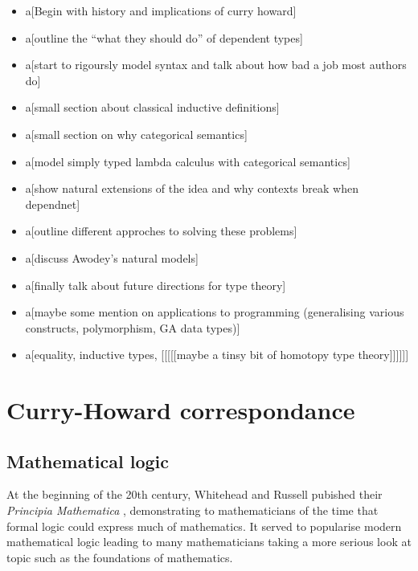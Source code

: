 \begin{itemize}
\item a[Begin with history and implications of curry howard]

\item a[outline the ``what they should do'' of dependent types]

\item a[start to rigoursly model syntax and talk about how bad a job most authors do]

\item a[small section about classical inductive definitions]

\item a[small section on why categorical semantics]

\item a[model simply typed lambda calculus with categorical semantics]

\item a[show natural extensions of the idea and why contexts break when dependnet]

\item a[outline different approches to solving these problems]

\item a[discuss Awodey's natural models]

\item a[finally talk about future directions for type theory]

\item a[maybe some mention on applications to programming (generalising various constructs, polymorphism, GA data types)]

\item a[equality, inductive types, [[[[[maybe a tinsy bit of homotopy type theory]]]]]]
\end{itemize}

\section{Curry-Howard correspondance}

\subsection{Mathematical logic}

At the beginning of the 20th century, Whitehead and Russell pubished their \emph{Principia Mathematica} \cite{GlossarWiki:Whitehead_Russell:1910}, demonstrating to mathematicians of the time that formal logic could express much of mathematics. It served to popularise modern mathematical logic leading to many mathematicians taking a more serious look at topic such as the foundations of mathematics.

